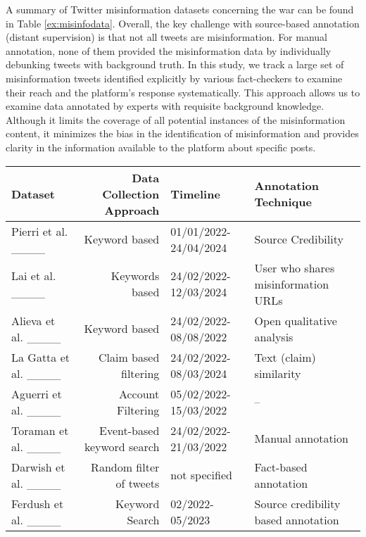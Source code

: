 A summary of Twitter misinformation datasets concerning the war can be found in Table \ref{ex:misinfodata}. 
Overall, the key challenge with source-based annotation (distant supervision) is that not all tweets are misinformation. 
For manual annotation, none of them provided the misinformation data by individually debunking tweets with background truth. 
In this study, we track a large set of misinformation tweets identified explicitly by various fact-checkers to examine their reach and the platform's response systematically. This approach allows us to examine data annotated by experts with requisite background knowledge. 
Although it limits the coverage of all potential instances of the misinformation content, it minimizes the bias in the identification of misinformation and provides clarity in the information available to the platform about specific posts. 


\begin{table*}[!htbp]
    \centering
    \small
    \caption{An Overview of Textual Datasets on misinformation on Twitter.} %
        \renewcommand{\familydefault}{\ttdefault}
\begin{tabular}{ p{2.2cm}rlp{5cm}  }  %
 \toprule

Dataset & Data Collection Approach & Timeline & Annotation Technique\\ \midrule
Pierri et al. ____ & Keyword based & 01/01/2022-24/04/2024 & Source Credibility \\ 

Lai et al. ____ & Keywords based & 24/02/2022-12/03/2024 & User who shares misinformation URLs \\

Alieva et al. ____& Keyword based & 24/02/2022-08/08/2022 & Open qualitative analysis \\

La Gatta et al. ____ & Claim based filtering & 24/02/2022-08/03/2024 & Text (claim) similarity\\

Aguerri et al. ____ & Account Filtering & 05/02/2022-15/03/2022 & -- \\

Toraman et al. ____ & Event-based keyword search & 24/02/2022-21/03/2022 & Manual annotation\\

Darwish et al. ____ & Random filter of tweets & not specified & Fact-based annotation \\

Ferdush et al. ____ & Keyword Search & 02/2022-05/2023 & Source credibility based annotation \\
\bottomrule 

    \end{tabular}%
    \label{ex:misinfodata}%
\end{table*}%


